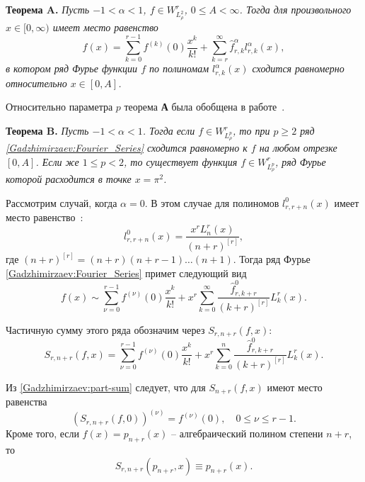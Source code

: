 \textbf{Теорема A.}
\textit{
Пусть $-1<\alpha<1$, $f\in W^r_{L^2_\rho}$, $0\le A<\infty$. Тогда для произвольного $x\in [0,\infty)$ имеет место равенство
\begin{equation*}
f(x) = \sum_{k=0}^{r-1}f^{(k)}(0)\frac{x^k}{k!}+\sum_{k=r}^{\infty} \hat{f}_{r,k}^\alpha l_{r,k}^\alpha(x),
\end{equation*}
в котором ряд Фурье функции $f$ по полиномам $l_{r,k}^{\alpha}(x)$ сходится равномерно относительно $x\in[0,A]$.
}

Относительно параметра $p$ теорема \textbf{А} была обобщена в работе~\cite{Gadzhimirzaev:RamIzv2020}.

\textbf{Теорема B.}
\textit{
Пусть $-1<\alpha<1$. Тогда если $f\in W^r_{L^p_\rho}$, то при $p\ge2$ ряд \eqref{Gadzhimirzaev:Fourier_Series} сходится равномерно к $f$ на любом отрезке $[0,A]$. Если же $1\le p<2$, то существует функция $f\in W^r_{L^p_\rho}$, ряд Фурье которой расходится в точке $x=\pi^2$.
}

Рассмотрим случай, когда $\alpha=0$. В этом случае для полиномов $l_{r,r+n}^{0}(x)$ имеет место равенство~\cite[следствие 3.1]{Gadzhimirzaev:ShII-MMG}:
\begin{equation*}
l_{r,r+n}^{0}(x)=\frac{x^r L_n^r(x)}{(n+r)^{[r]}},
\end{equation*}
где $(n+r)^{[r]}=(n+r)(n+r-1)\ldots(n+1)$.
Тогда ряд Фурье \eqref{Gadzhimirzaev:Fourier_Series} примет следующий вид
\begin{equation*}
f(x)\sim \sum_{\nu=0}^{r-1}f^{(\nu)}(0)\frac{x^k}{k!}+x^r\sum_{k=0}^{\infty} \frac{\hat{f}_{r,k+r}^0}{(k+r)^{[r]}}L_k^r(x).
\end{equation*}

Частичную сумму этого ряда обозначим через $S_{r,n+r}(f,x)$:
\begin{equation}\label{Gadzhimirzaev:part-sum}
S_{r,n+r}(f,x)=\sum_{\nu=0}^{r-1}f^{(\nu)}(0)\frac{x^k}{k!}+x^r\sum_{k=0}^{n} \frac{\hat{f}_{r,k+r}^0}{(k+r)^{[r]}}L_k^r(x).
\end{equation}

Из \eqref{Gadzhimirzaev:part-sum} следует, что для $S_{n+r}(f,x)$ имеют место равенства
\begin{equation*}
\left(S_{r,n+r}(f,0)\right)^{(\nu)}=f^{(\nu)}(0), \quad 0\le\nu\le r-1.
\end{equation*}
Кроме того, если $f(x)=p_{n+r}(x)$ -- алгебраический полином степени $n+r$, то
\begin{equation}\label{Gadzhimirzaev:part-sum-second-prop}
S_{r,n+r}(p_{n+r},x)\equiv p_{n+r}(x).
\end{equation}

